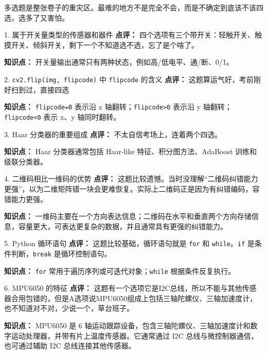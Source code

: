 多选题是整张卷子的重灾区。最难的地方不是完全不会，而是不确定到底该不该四选，选多了又害怕。

\begin{question}{1. 属于开关量类型的传感器和器件}
\textbf{点评：} 四个选项有三个带开关：轻触开关、触摸开关、倾斜开关，剩下一个不知道选不选，忘了是个啥了。

\textbf{知识点：} 开关量输出通常只有两种状态，例如高/低电平、通/断、0/1。
\end{question}

\begin{question}{2. \texttt{cv2.flip(img, flipcode)} 中 \texttt{flipcode} 的含义}
\textbf{点评：} 这题算运气好，考前刚好扫到过，直接四选

\textbf{知识点：} \texttt{flipcode=0} 表示沿 x 轴翻转；\texttt{flipcode>0} 表示沿 y 轴翻转；\texttt{flipcode<0} 表示 x、y 轴同时翻转。
\end{question}

\begin{question}{3. Haar 分类器的重要组成}
\textbf{点评：} 不太自信考场上，连着两个四选。

\textbf{知识点：} Haar 分类器通常包括 Haar-like 特征、积分图方法、AdaBoost 训练和级联分类器。
\end{question}

\begin{question}{4. 二维码相比一维码的优势}
\textbf{点评：} 这题比较遗憾。当时没理解“二维码纠错能力更强”，以为二维矩阵错一块会更难恢复。实际上二维码正是因为有纠错编码，容错能力更强。

\textbf{知识点：} 一维码主要在一个方向表达信息；二维码在水平和垂直两个方向存储信息，容量更大，可表达更复杂的数据，并且通常具有更强的纠错能力。
\end{question}

\begin{question}{5. Python 循环语句}
\textbf{点评：} 这题比较基础，循环语句就是 \texttt{for} 和 \texttt{while}。\texttt{if} 是条件判断，\texttt{break} 是循环控制语句。

\textbf{知识点：} \texttt{for} 常用于遍历序列或可迭代对象；\texttt{while} 根据条件反复执行。
\end{question}

\begin{question}{6. MPU6050 的特征}
\textbf{点评：} 这题有一个选项它是I2C总线，所以不能与其他传感器合用包错的，但是A选项说MPU6050组成上包括三轴陀螺仪、三轴加速度计，也不知道对不对，少说一个，草台班子。

\textbf{知识点：} MPU6050 是 6 轴运动跟踪设备，包含三轴陀螺仪、三轴加速度计和数字运动处理器，并带有片上温度传感器。它通常通过 I2C 总线与微控制器通信，也可通过辅助 I2C 总线连接其他传感器。
\end{question}

